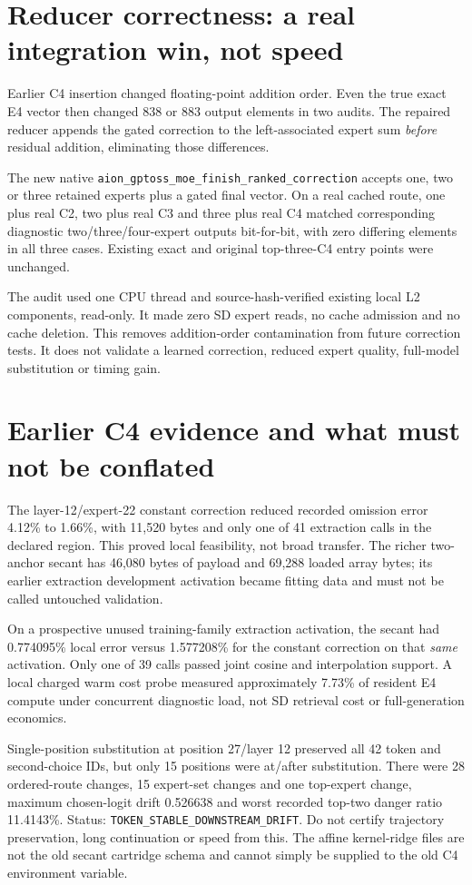 \documentclass[11pt,a4paper]{article}
\begin{document}
\section{Reducer correctness: a real integration win, not speed}
Earlier C4 insertion changed floating-point addition order. Even the true
exact E4 vector then changed 838 or 883 output elements in two audits.
The repaired reducer appends the gated correction to the left-associated
expert sum \emph{before} residual addition, eliminating those differences.

The new native \texttt{aion\_gptoss\_moe\_finish\_ranked\_correction} accepts
one, two or three retained experts plus a gated final vector. On a real
cached route, one plus real C2, two plus real C3 and three plus real C4
matched corresponding diagnostic two/three/four-expert outputs bit-for-bit,
with zero differing elements in all three cases. Existing exact and original
top-three-C4 entry points were unchanged.

The audit used one CPU thread and source-hash-verified existing local L2
components, read-only. It made zero SD expert reads, no cache admission and
no cache deletion. This removes addition-order contamination from future
correction tests. It does not validate a learned correction, reduced expert
quality, full-model substitution or timing gain.

\section{Earlier C4 evidence and what must not be conflated}
The layer-12/expert-22 constant correction reduced recorded omission error
4.12\% to 1.66\%, with 11,520 bytes and only one of 41 extraction calls in
the declared region. This proved local feasibility, not broad transfer.
The richer two-anchor secant has 46,080 bytes of payload and 69,288 loaded
array bytes; its earlier extraction development activation became fitting
data and must not be called untouched validation.

On a prospective unused training-family extraction activation, the secant
had 0.774095\% local error versus 1.577208\% for the constant correction on
that \emph{same} activation. Only one of 39 calls passed joint cosine and
interpolation support. A local charged warm cost probe measured approximately
7.73\% of resident E4 compute under concurrent diagnostic load, not SD
retrieval cost or full-generation economics.

Single-position substitution at position 27/layer 12 preserved all 42 token
and second-choice IDs, but only 15 positions were at/after substitution.
There were 28 ordered-route changes, 15 expert-set changes and one top-expert
change, maximum chosen-logit drift 0.526638 and worst recorded top-two danger
ratio 11.4143\%. Status: \texttt{TOKEN\_STABLE\_DOWNSTREAM\_DRIFT}.
Do not certify trajectory preservation, long continuation or speed from this.
The affine kernel-ridge files are not the old secant cartridge schema and
cannot simply be supplied to the old C4 environment variable.
\end{document}
